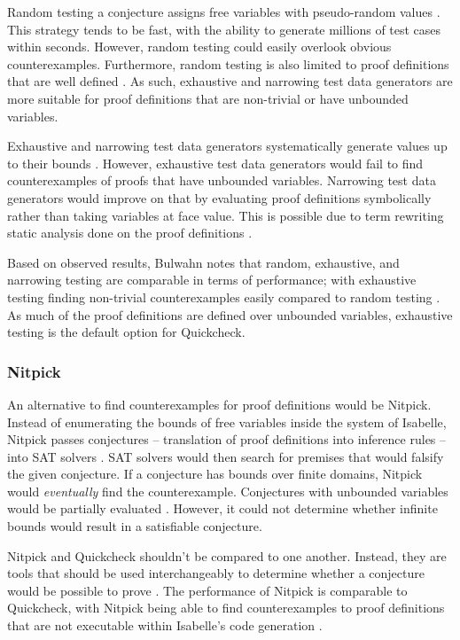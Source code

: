Random testing a conjecture assigns free variables with pseudo-random values \cite[Sec. 3.1]{isabelleQuickcheck}. This strategy tends to be fast, 
with the ability to generate millions of test cases within seconds. However, random testing could easily overlook obvious counterexamples. 
Furthermore, random testing is also limited to proof definitions that are well defined \cite{isabelleQuickcheck}. As such, exhaustive and narrowing 
test data generators are more suitable for proof definitions that are non-trivial or have unbounded variables.

Exhaustive and narrowing test data generators systematically generate values up to their bounds \cite{isabelleQuickcheck}. 
However, exhaustive test data generators would fail to find counterexamples of proofs that have unbounded variables. Narrowing test data generators 
would improve on that by evaluating proof definitions symbolically rather than taking variables at face value. This is possible due to 
term rewriting static analysis done on the proof definitions \cite[Sec. 5]{isabelleQuickcheck}.

Based on observed results, Bulwahn notes that random, exhaustive, and narrowing testing are comparable in terms of performance; with 
exhaustive testing finding non-trivial counterexamples easily compared to random testing \cite[Sec. 7]{isabelleQuickcheck}. As much of the 
proof definitions are defined over unbounded variables, exhaustive testing is the default option for Quickcheck.

\subsubsection{Nitpick}
\label{sec:Nitpick}

An alternative to find counterexamples for proof definitions would be Nitpick. Instead of enumerating the bounds of free variables inside the 
system of Isabelle, Nitpick passes conjectures -- translation of proof definitions into inference rules -- into SAT solvers 
\cite[Sec. 5]{isabelleProof}. SAT solvers would then search for premises that would falsify the given conjecture. If a conjecture 
has bounds over finite domains, Nitpick would \emph{eventually} find the counterexample. Conjectures with unbounded variables would be partially 
evaluated \cite[Sec. 5.2]{isabelleProof}. However, it could not determine whether infinite bounds would result in a satisfiable conjecture.

Nitpick and Quickcheck shouldn't be compared to one another. Instead, they are tools that should be used interchangeably to determine 
whether a conjecture would be possible to prove \cite{isabelleQuickcheck}. The performance of Nitpick is comparable to Quickcheck, with 
Nitpick being able to find counterexamples to proof definitions that are not executable within Isabelle's code generation 
\cite[Sec. 7]{isabelleQuickcheck}.


